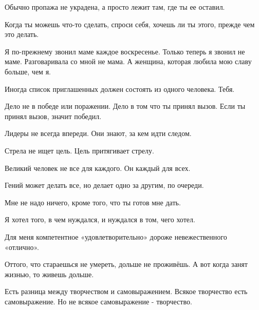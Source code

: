 Обычно пропажа не украдена, а просто лежит там, где ты ее оставил. 

Когда ты можешь что-то сделать, спроси себя, хочешь ли ты этого, прежде чем это
делать. 

Я по-прежнему звонил маме каждое воскресенье. Только теперь я звонил не маме.
Разговаривала со мной не мама. А женщина, которая любила мою славу больше, чем
я. 

Иногда список приглашенных должен состоять из одного человека. Тебя. 

Дело не в победе или поражении. Дело в том что ты принял вызов. Если ты принял
вызов, значит победил.

Лидеры не всегда впереди. Они знают, за кем идти следом.

Стрела не ищет цель. Цель притягивает стрелу.

Великий человек не все для каждого. Он каждый для всех. 

Гений может делать все, но делает одно за другим, по очереди.

Мне не надо ничего, кроме того, что ты готов мне дать.

Я хотел того, в чем нуждался, и нуждался в том, чего хотел.

Для меня компетентное «удовлетворительно» дороже невежественного «отлично».

Оттого, что стараешься не умереть, дольше не проживёшь. А вот когда занят
жизнью, то живешь дольше.

Есть разница между творчеством и самовыражением. Всякое творчество есть
самовыражение. Но не всякое самовыражение - творчество.
